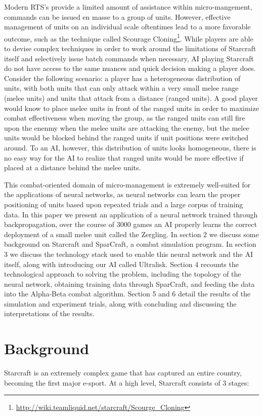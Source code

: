 \documentclass[twocolumn]{article}
\begin{document}
Modern RTS's provide a limited amount of assistance within micro-mangement, commands can be issued en masse to a group of units. However, effective management of units on an individual scale oftentimes lead to a more favorable outcome, such as the technique called Scourage Cloning\footnote{\tiny{\url{http://wiki.teamliquid.net/starcraft/Scourge_Cloning}}}. While players are able to devise complex techniques in order to work around the limitations of Starcraft itself and selectively issue batch commands when necessary, AI playing Starcraft do not have access to the same nuances and quick decision making a player does. Consider the following scenario: a player has a heterogeneous distribution of units, with both units that can only attack within a very small melee range (melee units) and units that attack from a distance (ranged units). A good player would know to place melee units in front of the ranged units in order to maximize combat effectiveness when moving the group, as the ranged units can still fire upon the enenmy when the melee units are attacking the enemy, but the melee units would be blocked behind the ranged units if unit positions were switched around. To an AI, however, this distribution of units looks homogeneous, there is no easy way for the AI to realize that ranged units would be more effective if placed at a distance behind the melee units. 

This combat-oriented domain of micro-management is extremely well-suited for the applications of neural networks, as neural networks can learn the proper positioning of units based upon repeated trials and a large corpus of training data. In this paper we present an application of a neural network trained through backpropagation, over the course of 3000 games an AI properly learns the correct deployment of a small melee unit called the Zergling. In section 2 we discuss some background on Starcraft and SparCraft, a combat simulation program. In section 3 we discuss the technology stack used to enable this neural network and the AI itself, along with introducing our AI called Ultralisk. Section 4 recounts the technological approach to solving the problem, including the topology of the neural network, obtaining training data through SparCraft, and feeding the data into the Alpha-Beta combat algorithm. Section 5 and 6 detail the results of the simulation and experiment trials, along with concluding and discussing the interpretations of the results. 

\section{Background}
Starcraft is an extremely complex game that has captured an entire country, becoming the first major e-sport. At a high level, Starcraft consists of 3 stages:
\end{document}
